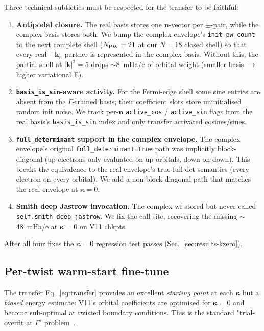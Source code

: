 \documentclass[reprint,amsmath,amssymb,aps,prb,floatfix,nofootinbib]{revtex4-2}
\begin{document}
Three technical subtleties must be respected for the transfer to be
faithful:

\begin{enumerate}
\item \textbf{Antipodal closure.} The real basis stores one
      $\mathbf{n}$-vector per $\pm$-pair, while the complex basis
      stores both.  We bump the complex envelope's
      \texttt{init\_pw\_count} to the next complete shell
      ($N_{\rm PW} = 21$ at our $N = 18$ closed shell) so that every
      real $\pm\mathbf{k}_n$ partner is represented in the complex
      basis.  Without this, the partial-shell at $|{\mathbf k}|^2 = 5$
      drops $\sim 8$~mHa/e of orbital weight (smaller basis $\to$
      higher variational E).
\item \textbf{\texttt{basis\_is\_sin}-aware activity.} For the
      Fermi-edge shell some sine entries are absent from the
      $\Gamma$-trained basis; their coefficient slots store
      uninitialised random init noise.  We track per-$\mathbf{n}$
      \texttt{active\_cos} / \texttt{active\_sin} flags from the real
      basis's \texttt{basis\_is\_sin} index and only transfer
      activated cosines/sines.
\item \textbf{\texttt{full\_determinant} support in the complex
      envelope.}  The complex envelope's original
      \texttt{full\_determinant=True} path was implicitly
      block-diagonal (up electrons only evaluated on up orbitals,
      down on down).  This breaks the equivalence to the real
      envelope's true full-det semantics (every electron on every
      orbital).  We add a non-block-diagonal path that matches the
      real envelope at $\bm\kappa = 0$.
\item \textbf{Smith deep Jastrow invocation.} The complex wf
      stored but never called \texttt{self.smith\_deep\_jastrow}.
      We fix the call site, recovering the missing $\sim$48~mHa/e
      at $\bm\kappa = 0$ on V11 chkpts.
\end{enumerate}

After all four fixes the $\bm\kappa = 0$ regression test passes
(Sec.~\ref{sec:results-kzero}).

\subsection{Per-twist warm-start fine-tune}\label{sec:perk}
The transfer Eq.~\eqref{eq:transfer} provides an excellent
\emph{starting point} at each $\bm\kappa$ but a \emph{biased}
energy estimate: V11's orbital coefficients are optimised for
$\bm\kappa = 0$ and become sub-optimal at twisted boundary
conditions.  This is the standard "trial-overfit at $\Gamma$"
problem~\cite{Krogel2013}.
\end{document}
